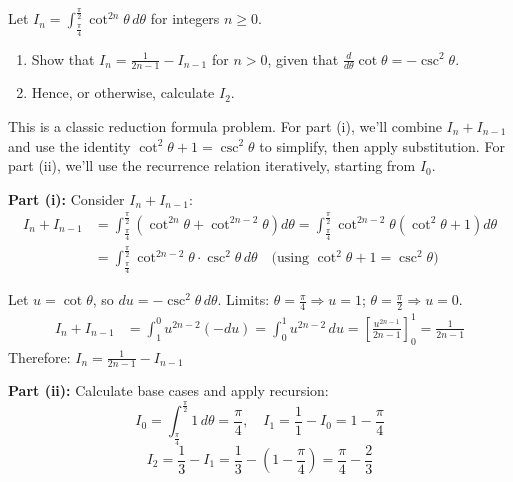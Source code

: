 
\begin{problem}
Let $\displaystyle I_n = \int_{\frac{\pi}{4}}^{\frac{\pi}{2}} \cot^{2n}\theta \, d\theta$ for integers $n \geq 0$.

\begin{enumerate}[label=(\roman*)]
    \item Show that $\displaystyle I_n = \frac{1}{2n-1} - I_{n-1}$ for $n > 0$, given that $\displaystyle \frac{d}{d\theta}\cot\theta = -\csc^2\theta$.
    \item Hence, or otherwise, calculate $I_2$.
\end{enumerate}
\end{problem}

\begin{hint}
This is a classic reduction formula problem. For part (i), we'll combine $I_n + I_{n-1}$ and use the identity $\cot^2\theta + 1 = \csc^2\theta$ to simplify, then apply substitution. For part (ii), we'll use the recurrence relation iteratively, starting from $I_0$.
\end{hint}

\begin{solution}
\textbf{Part (i):} Consider $I_n + I_{n-1}$:
\begin{align*}
I_n + I_{n-1} &= \int_{\frac{\pi}{4}}^{\frac{\pi}{2}} \left( \cot^{2n}\theta + \cot^{2n-2}\theta \right) d\theta = \int_{\frac{\pi}{4}}^{\frac{\pi}{2}} \cot^{2n-2}\theta \left( \cot^2\theta + 1 \right) d\theta \\
&= \int_{\frac{\pi}{4}}^{\frac{\pi}{2}} \cot^{2n-2}\theta \cdot \csc^2\theta \, d\theta \quad \text{(using $\cot^2\theta + 1 = \csc^2\theta$)}
\end{align*}

Let $u = \cot\theta$, so $du = -\csc^2\theta \, d\theta$. Limits: $\theta = \frac{\pi}{4} \Rightarrow u = 1$; $\theta = \frac{\pi}{2} \Rightarrow u = 0$.
\begin{align*}
I_n + I_{n-1} &= \int_{1}^{0} u^{2n-2} (-du) = \int_{0}^{1} u^{2n-2} \, du = \left[ \frac{u^{2n-1}}{2n-1} \right]_{0}^{1} = \frac{1}{2n-1}
\end{align*}
Therefore: $\boxed{I_n = \frac{1}{2n-1} - I_{n-1}}$

\textbf{Part (ii):} Calculate base cases and apply recursion:
\[
I_0 = \int_{\frac{\pi}{4}}^{\frac{\pi}{2}} 1 \, d\theta = \frac{\pi}{4}, \quad I_1 = \frac{1}{1} - I_0 = 1 - \frac{\pi}{4}
\]
\[
I_2 = \frac{1}{3} - I_1 = \frac{1}{3} - \left( 1 - \frac{\pi}{4} \right) = \boxed{\frac{\pi}{4} - \frac{2}{3}}
\]
\end{solution}

